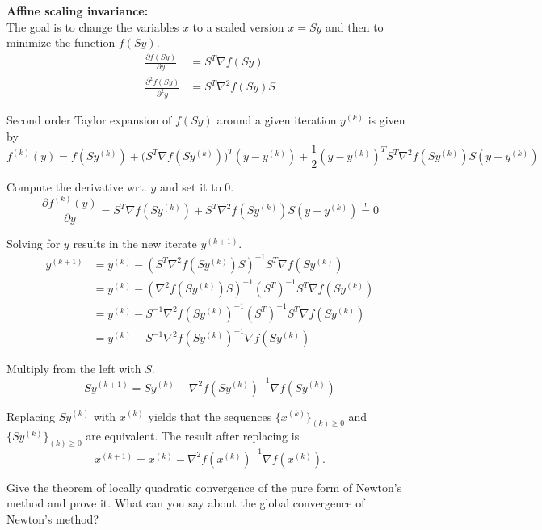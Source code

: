 \documentclass[12pt,a4paper]{article}
\begin{document}
\textbf{Affine scaling invariance:}\\
The goal is to change the variables $x$ to a scaled version $x=Sy$ and then to minimize the function $f(Sy)$.
\begin{align*}
    \frac{\partial f(Sy)}{\partial y} &= S^T \nabla f(Sy)\\
    \frac{\partial^2 f(Sy)}{\partial^2 y} &= S^T \nabla^2 f(Sy)S
\end{align*}

Second order Taylor expansion of $f(Sy)$ around a given iteration $y^{(k)}$ is given by
\begin{equation*}
    f^{(k)}(y) = f(Sy^{(k)}) + \biggl(S^T \nabla f(Sy^{(k)})\biggr)^T(y-y^{(k)}) + \frac{1}{2}(y-y^{(k)})^T S^T \nabla^2 f(Sy^{(k)})S(y-y^{(k)})
\end{equation*}

Compute the derivative wrt. $y$ and set it to 0.
\begin{equation*}
    \frac{\partial f^{(k)}(y)}{\partial y} = S^T \nabla f(Sy^{(k)}) + S^T \nabla^2 f(Sy^{(k)})S(y-y^{(k)}) \overset{!}{=}0
\end{equation*}

Solving for $y$ results in the new iterate $y^{(k+1)}$.
\begin{align*}
    y^{(k + 1)} &= y^{(k)} - (S^T \nabla^2f(Sy^{(k)})S)^{-1} S^T \nabla f(Sy^{(k)})\\
            &= y^{(k)} - (\nabla^2f(Sy^{(k)})S)^{-1} (S^T)^{-1} S^T \nabla f(Sy^{(k)})\\
            &= y^{(k)} - S^{-1}\nabla^2f(Sy^{(k)})^{-1} (S^T)^{-1} S^T \nabla f(Sy^{(k)})\\
            &= y^{(k)} - S^{-1} \nabla^2 f(Sy^{(k)})^{-1} \nabla f(Sy^{(k)})
\end{align*}

Multiply from the left with $S$.
\begin{equation*}
    Sy^{(k+1)} = Sy^{(k)} - \nabla^2 f(Sy^{(k)})^{-1} \nabla f(Sy^{(k)})
\end{equation*}

Replacing $Sy^{(k)}$ with $x^{(k)}$ yields that the sequences $\{{x^{(k)}\}}_{{(k)} \geq 0}$ and $\{{Sy^{(k)}\}}_{{(k)} \geq 0}$ are equivalent. The result after replacing is
\begin{equation*}
    x^{(k+1)} = x^{(k)} - \nabla^2 f(x^{(k)})^{-1} \nabla f(x^{(k)}).
\end{equation*}

\begin{question}
Give the theorem of locally quadratic convergence of the pure form of Newton’s method and prove it. What can you say about the global convergence of Newton’s method?
\end{question}
\end{document}
